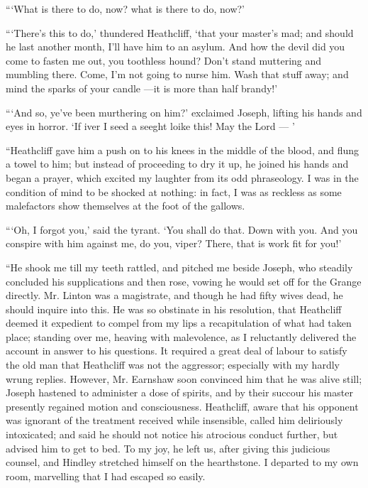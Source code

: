 \par “‘What is there to do, now? what is there to do, now?’
\par “‘There's this to do,’ thundered Heathcliff, ‘that your master's mad; and should he last another month, I'll have him to an asylum. And how the devil did you come to fasten me out, you toothless hound? Don't stand muttering and mumbling there. Come, I'm not going to nurse him. Wash that stuff away; and mind the sparks of your candle —it is more than half brandy!’
\par “‘And so, ye've been murthering on him?’ exclaimed Joseph, lifting his hands and eyes in horror. ‘If iver I seed a seeght loike this! May the Lord — ’
\par “Heathcliff gave him a push on to his knees in the middle of the blood, and flung a towel to him; but instead of proceeding to dry it up, he joined his hands and began a prayer, which excited my laughter from its odd phraseology. I was in the condition of mind to be shocked at nothing: in fact, I was as reckless as some malefactors show themselves at the foot of the gallows.
\par “‘Oh, I forgot you,’ said the tyrant. ‘You shall do that. Down with you. And you conspire with him against me, do you, viper? There, that is work fit for you!’
\par “He shook me till my teeth rattled, and pitched me beside Joseph, who steadily concluded his supplications and then rose, vowing he would set off for the Grange directly. Mr. Linton was a magistrate, and though he had fifty wives dead, he should inquire into this. He was so obstinate in his resolution, that Heathcliff deemed it expedient to compel from my lips a recapitulation of what had taken place; standing over me, heaving with malevolence, as I reluctantly delivered the account in answer to his questions. It required a great deal of labour to satisfy the old man that Heathcliff was not the aggressor; especially with my hardly wrung replies. However, Mr. Earnshaw soon convinced him that he was alive still; Joseph hastened to administer a dose of spirits, and by their succour his master presently regained motion and consciousness. Heathcliff, aware that his opponent was ignorant of the treatment received while insensible, called him deliriously intoxicated; and said he should not notice his atrocious conduct further, but advised him to get to bed. To my joy, he left us, after giving this judicious counsel, and Hindley stretched himself on the hearthstone. I departed to my own room, marvelling that I had escaped so easily.
